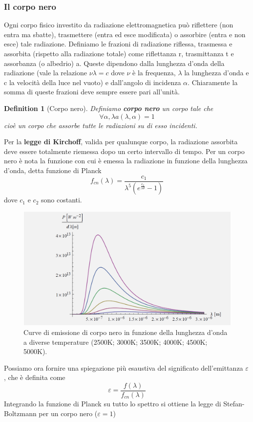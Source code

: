 \documentclass[10pt,a4paper]{article}
\newtheorem{definition}{Definition}
\begin{document}
\subsubsection{Il corpo nero} 
Ogni corpo fisico investito da radiazione elettromagnetica può riflettere (non entra ma sbatte), trasmettere (entra ed esce modificata) o assorbire (entra e non esce) tale radiazione. Definiamo le frazioni di radiazione riflessa, trasmessa e assorbita (rispetto alla radiazione totale) come riflettanza r, trasmittanza t e assorbanza (o albedrio) a. Queste dipendono dalla lunghezza d'onda della radiazione (vale la relazione \(\nu \lambda = c\) dove $\nu$ è la frequenza, $\lambda$ la lunghezza d'onda e c la velocità della luce nel vuoto) e dall'angolo di incidenza $\alpha$. Chiaramente la somma di queste frazioni deve sempre essere pari all'unità. 
\begin{definition}[Corpo nero]
	Definiamo \textbf{corpo nero} un corpo tale che
	\[\forall \alpha, \lambda a(\lambda, \alpha) = 1\]
	cioè un corpo che assorbe tutte le radiazioni su di esso incidenti. 
\end{definition}
Per la \textbf{legge di Kirchoff}, valida per qualunque corpo, la radiazione assorbita deve essere totalmente riemessa dopo un certo intervallo di tempo. Per un corpo nero è nota la funzione con cui è emessa la radiazione in funzione della lunghezza d'onda, detta funzione di Planck
\[f_{cn}(\lambda) = \frac{c_1}{\lambda^5 (e^{\frac{c_2}{\lambda\theta}}-1)}\]
dove $c_1$ e $c_2$ sono costanti.
\begin{figure}[h!]
	\centering
	\includegraphics[width=0.7\linewidth]{../images/corpo_nero}
	\caption{Curve di emissione di corpo nero in funzione della lunghezza d’onda a
		diverse temperature (2500K; 3000K; 3500K; 4000K; 4500K; 5000K).}
	\label{fig:corpo_nero}
\end{figure}
\FloatBarrier
Possiamo ora fornire una spiegazione più esaustiva del significato dell'emittanza $\varepsilon$, che è definita come
\[\varepsilon= \frac{f(\lambda)}{f_{cn}(\lambda)}\]
Integrando la funzione di Planck su tutto lo spettro si ottiene la legge di Stefan-Boltzmann per un corpo nero ($\varepsilon = 1$)
\end{document}
